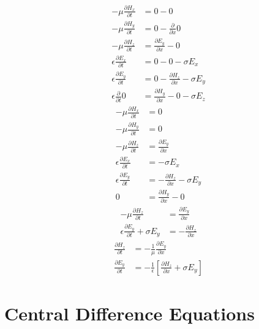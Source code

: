\documentclass{article}
\begin{document}
        \begin{align*}
            -\mu\frac{\partial H_x}{\partial t}&=0-0\\
            -\mu\frac{\partial H_y}{\partial t}&=0-\frac{\partial}{\partial x}0\\
            -\mu\frac{\partial H_z}{\partial t}&=\frac{\partial E_y}{\partial x}-0\\
            \epsilon\frac{\partial E_x}{\partial t}&=0-0-\sigma E_x\\
            \epsilon\frac{\partial E_y}{\partial t}&=0-\frac{\partial H_z}{\partial x}-\sigma E_y\\
            \epsilon\frac{\partial }{\partial t}0&=\frac{\partial H_y}{\partial x}-0-\sigma E_z
        \end{align*}
        \begin{align*}
            -\mu\frac{\partial H_x}{\partial t}&=0\\
            -\mu\frac{\partial H_y}{\partial t}&=0\\
            -\mu\frac{\partial H_z}{\partial t}&=\frac{\partial E_y}{\partial x}\\
            \epsilon\frac{\partial E_x}{\partial t}&=-\sigma E_x\\
            \epsilon\frac{\partial E_y}{\partial t}&=-\frac{\partial H_z}{\partial x}-\sigma E_y\\
            0&=\frac{\partial H_y}{\partial x}-0
        \end{align*}
        \begin{align*}
            -\mu\frac{\partial H_z}{\partial t}&=\frac{\partial E_y}{\partial x}\\
            \epsilon\frac{\partial E_y}{\partial t}+\sigma E_y&=-\frac{\partial H_z}{\partial x}
        \end{align*}
        \begin{align*}
            \frac{\partial H_z}{\partial t}&=-\frac{1}{\mu}\frac{\partial E_y}{\partial x}\\
            \frac{\partial E_y}{\partial t}&=-\frac{1}{\epsilon}\left[\frac{\partial H_z}{\partial x}+\sigma E_y\right]
        \end{align*}

    \newpage
    \section{Central Difference Equations}
\end{document}
